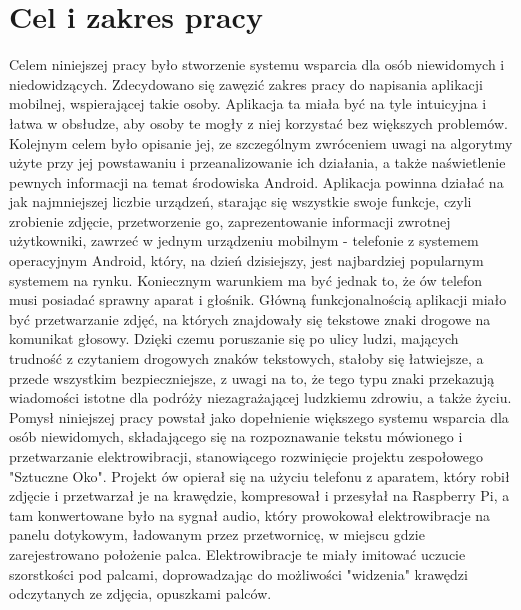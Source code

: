 \documentclass[eng,oneside]{mgr}
\begin{document}
\section{Cel i zakres pracy}
Celem niniejszej pracy było stworzenie systemu wsparcia dla osób niewidomych i niedowidzących. Zdecydowano się zawęzić zakres pracy do napisania aplikacji mobilnej, wspierającej takie osoby. Aplikacja ta miała być na tyle intuicyjna i łatwa w obsłudze, aby osoby te mogły z niej korzystać bez większych problemów. Kolejnym celem było opisanie jej, ze szczególnym zwróceniem uwagi na algorytmy użyte przy jej powstawaniu i przeanalizowanie ich działania, a także naświetlenie pewnych informacji na temat środowiska Android. Aplikacja powinna działać na jak najmniejszej liczbie urządzeń, starając się wszystkie swoje funkcje, czyli zrobienie zdjęcie, przetworzenie go, zaprezentowanie informacji zwrotnej użytkowniki, zawrzeć w jednym urządzeniu mobilnym - telefonie z systemem operacyjnym Android, który, na dzień dzisiejszy, jest najbardziej popularnym systemem na rynku. Koniecznym warunkiem ma być jednak to, że ów telefon musi posiadać sprawny aparat i głośnik. Główną funkcjonalnością aplikacji miało być przetwarzanie zdjęć, na których znajdowały się tekstowe znaki drogowe na komunikat głosowy. Dzięki czemu poruszanie się po ulicy ludzi, mających trudność z czytaniem drogowych znaków tekstowych, stałoby się łatwiejsze, a przede wszystkim bezpieczniejsze, z uwagi na to, że tego typu znaki przekazują wiadomości istotne dla podróży niezagrażającej ludzkiemu zdrowiu, a także życiu. Pomysł niniejszej pracy powstał jako dopełnienie większego systemu wsparcia dla osób niewidomych, składającego się na rozpoznawanie tekstu mówionego i przetwarzanie elektrowibracji, stanowiącego rozwinięcie projektu zespołowego "Sztuczne Oko". Projekt ów opierał się na użyciu telefonu z aparatem, który robił zdjęcie i przetwarzał je na krawędzie, kompresował i przesyłał na Raspberry Pi, a tam konwertowane było na sygnał audio, który prowokował elektrowibracje na panelu dotykowym, ładowanym przez przetwornicę, w miejscu gdzie zarejestrowano położenie palca. Elektrowibracje te miały imitować uczucie szorstkości pod palcami, doprowadzając do możliwości "widzenia" krawędzi odczytanych ze zdjęcia, opuszkami palców.
\end{document}
